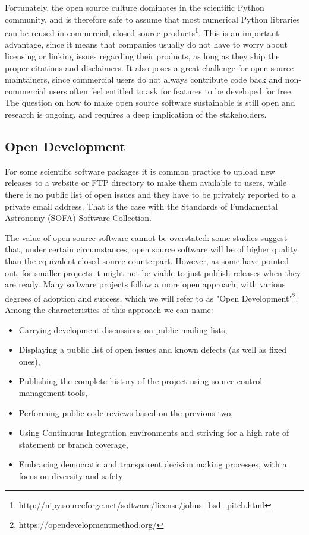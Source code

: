 Fortunately, the open source culture dominates in the scientific Python community, and is therefore safe to assume that most numerical Python libraries can be reused in commercial, closed source products\footnote{http://nipy.sourceforge.net/software/license/johns\_bsd\_pitch.html}. This is an important advantage, since it means that companies usually do not have to worry about licensing or linking issues regarding their products, as long as they ship the proper citations and disclaimers. It also poses a great challenge for open source maintainers, since commercial users do not always contribute code back and non-commercial users often feel entitled to ask for features to be developed for free. The question on how to make open source software sustainable is still open and research is ongoing, and requires a deep implication of the stakeholders\cite{Shah_2006}.

\subsection{Open Development}

For some scientific software packages it is common practice to upload new releases to a website or FTP directory to make them available to users, while there is no public list of open issues and they have to be privately reported to a private email address. That is the case with the Standards of Fundamental Astronomy (SOFA) Software Collection.

The value of open source software cannot be overstated: some studies suggest that, under certain circumstances, open source software will be of higher quality than the equivalent closed source counterpart\cite{Kuan}. However, as some have pointed out, for smaller projects it might not be viable to just publish releases when they are ready\cite{Prli__2012}. Many software projects follow a more open approach, with various degrees of adoption and success, which we will refer to as "Open Development"\footnote{https://opendevelopmentmethod.org/}. Among the characteristics of this approach we can name:

\begin{itemize}
\item Carrying development discussions on public mailing lists,
\item Displaying a public list of open issues and known defects (as well as fixed ones),
\item Publishing the complete history of the project using source control management tools,
\item Performing public code reviews based on the previous two,
\item Using Continuous Integration environments and striving for a high rate of statement or branch coverage,
\item Embracing democratic and transparent decision making processes, with a focus on diversity and safety
\end{itemize}

